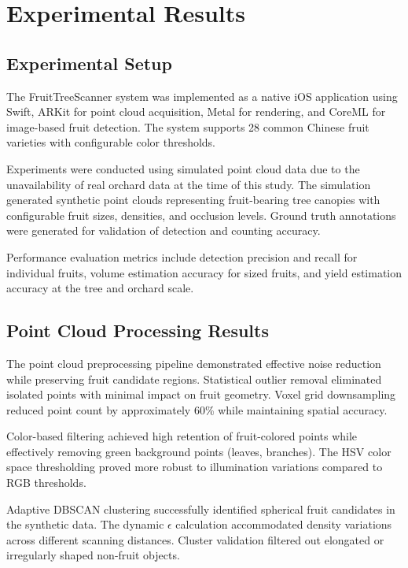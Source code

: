 \section{Experimental Results}
\label{sec:experiments}

\subsection{Experimental Setup}
The FruitTreeScanner system was implemented as a native iOS application using Swift, ARKit for point cloud acquisition, Metal for rendering, and CoreML for image-based fruit detection. The system supports 28 common Chinese fruit varieties with configurable color thresholds.

Experiments were conducted using simulated point cloud data due to the unavailability of real orchard data at the time of this study. The simulation generated synthetic point clouds representing fruit-bearing tree canopies with configurable fruit sizes, densities, and occlusion levels. Ground truth annotations were generated for validation of detection and counting accuracy.

Performance evaluation metrics include detection precision and recall for individual fruits, volume estimation accuracy for sized fruits, and yield estimation accuracy at the tree and orchard scale.

\subsection{Point Cloud Processing Results}
The point cloud preprocessing pipeline demonstrated effective noise reduction while preserving fruit candidate regions. Statistical outlier removal eliminated isolated points with minimal impact on fruit geometry. Voxel grid downsampling reduced point count by approximately 60\% while maintaining spatial accuracy.

Color-based filtering achieved high retention of fruit-colored points while effectively removing green background points (leaves, branches). The HSV color space thresholding proved more robust to illumination variations compared to RGB thresholds.

Adaptive DBSCAN clustering successfully identified spherical fruit candidates in the synthetic data. The dynamic $\epsilon$ calculation accommodated density variations across different scanning distances. Cluster validation filtered out elongated or irregularly shaped non-fruit objects.

